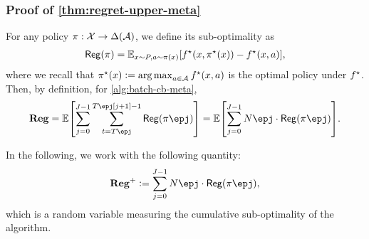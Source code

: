 \subsubsection{Proof of \cref{thm:regret-upper-meta}}
For any policy $\pi:\mathcal{X}\to\Delta(\mathcal{A})$, we define its sub-optimality as
\begin{align*}
    \mathsf{Reg}(\pi)=\mathbb{E}_{x\sim P, a\sim \pi(x)}{\left[  f^\star(x,\pi^\star(x))- f^\star(x,a)  \right]},
\end{align*}
where we recall that $\pi^\star(x)\mathrel{\mathop:}= \operatorname*{arg\,max}_{a\in\mathcal{A}} f^\star(x,a)$ is the optimal policy under $f^\star$.
Then, by definition, for \cref{alg:batch-cb-meta},
\begin{align*}
    \Reg=\EE\brac{ \sum_{j=0}^{J-1} \sum_{t=T\epj}^{T\epj[j+1]-1} \reg(\pi\epj)}
    =\EE\brac{ \sum_{j=0}^{J-1} N\epj \cdot \reg(\pi\epj)}.
\end{align*}

In the following, we work with the following quantity:
\begin{align*}
    \Reg^+\defeq \sum_{j=0}^{J-1} N\epj \cdot \reg(\pi\epj),
\end{align*}
which is a random variable measuring the cumulative sub-optimality of the algorithm.



